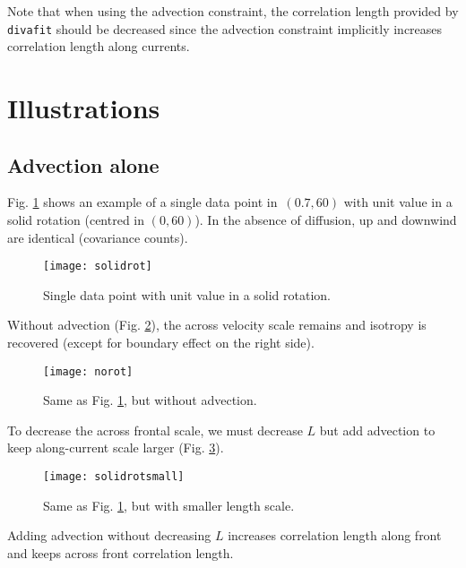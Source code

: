 Note that when using the advection constraint, the correlation length provided by {\tt divafit} should be decreased since the advection 
constraint implicitly increases correlation length along currents.


\section{Illustrations}

\subsection{Advection alone}

Fig. \ref{fig:solidrot} shows an example of a single data point in\, $(0.7,60)$ with unit value in a solid 
rotation (centred in $(0,60)$). In the absence of diffusion, up and downwind are identical (covariance 
counts).

\begin{figure}[H]
\parbox{.6\textwidth}{
\texttt{[image: solidrot]}
}\parbox{.4\textwidth}{
\caption{Single data point with unit value in a solid 
rotation. \label{fig:solidrot}}
}
\end{figure}


Without advection (Fig. \ref{fig:norot}), the across velocity scale remains and isotropy is 
recovered (except for boundary effect on the right side).

\begin{figure}[H]
\parbox{.6\textwidth}{
\texttt{[image: norot]}
}\parbox{.4\textwidth}{
\caption{Same as Fig. \ref{fig:solidrot}, but without advection. \label{fig:norot}}
}
\end{figure}



To decrease the across frontal scale, we must decrease $L$ but add advection 
to keep along-current scale larger (Fig. \ref{fig:solidrotsmall}).

\begin{figure}[H]
\parbox{.6\textwidth}{
\texttt{[image: solidrotsmall]}
}\parbox{.4\textwidth}{
\caption{Same as Fig. \ref{fig:solidrot}, but with smaller length scale. \label{fig:solidrotsmall}}
}
\end{figure}


Adding advection without decreasing $L$ increases correlation length 
along front and keeps across front correlation length.

